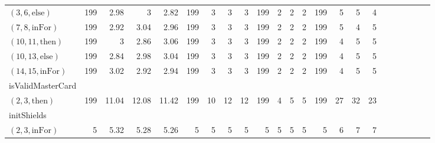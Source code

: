 \documentclass[sigconf]{acmart}
\newcommand{\thenBr}{\text{then}}
\newcommand{\elseBr}{\text{else}}
\newcommand{\inFor}{\text{inFor}}
\begin{document}
\begin{table*}
{\begin{tabular}{l|rrrr|rrrr|rrrr|rrrr|r|r|r|r|r|r}
    $(3,6,\elseBr)$   & 199         & 2.98        & 3              & 2.82          & 199   & 3     & 3       & 3       & 199      & 2        & 2          & 2           & 199      & 5       & 5          & 4 & & & & & & \\
    $(7,8,\inFor)$    & 199         & 2.92        & 3.04           & 2.96          & 199   & 3     & 3       & 3       & 199      & 2        & 2          & 2           & 199      & 5       & 4          & 5 & & & & & & \\
    $(10,11,\thenBr)$ & 199         & 3           & 2.86           & 3.06          & 199   & 3     & 3       & 3       & 199      & 2        & 2          & 2           & 199      & 4       & 5          & 5 & & & & & & \\
    $(10,13,\elseBr)$ & 199         & 2.84        & 2.98           & 3.04          & 199   & 3     & 3       & 3       & 199      & 2        & 2          & 2           & 199      & 4       & 5          & 5 & & & & & & \\
    $(14,15,\inFor)$  & 199         & 3.02        & 2.92           & 2.94          & 199   & 3     & 3       & 3       & 199      & 2        & 2          & 2           & 199      & 4       & 5          & 5 & & & & & & \\
    \midrule
    isValidMasterCard & \multicolumn{16}{l}{} \\ 
    $(2,3,\thenBr)$   & 199         & 11.04       & 12.08          & 11.42         & 199   & 10    & 12      & 12      & 199      & 4        & 5          & 5           & 199      & 27      & 32         & 23 & & & & & & \\
    \midrule
    \midrule
    initShields       &             &             &                &               &       &       &         &         &          &          &            &             &          &         &            & & & & & & &\\
    $(2,3,\inFor)$    & 5           & 5.32        & 5.28           & 5.26          & 5     & 5     & 5       & 5       & 5        & 5        & 5          & 5           & 5        & 6       & 7          & 7 & & & & & & \\

\end{tabular}}
\end{table*}
\end{document}
